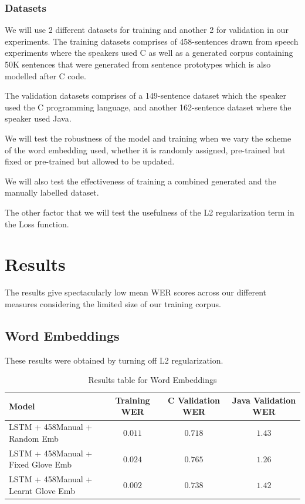 \documentclass[fyp]{socreport}
\begin{document}
\subsubsection{Datasets}
We will use 2 different datasets for training and another 2 for validation in
our experiments. The training datasets comprises of 458-sentences drawn from
speech experiments where the speakers used C as well as a generated corpus
containing 50K sentences that were generated from sentence prototypes which is
also modelled after C code.

The validation datasets comprises of a 149-sentence dataset which the speaker
used the C programming language, and another 162-sentence dataset where the speaker
used Java.

We will test the robustness of the model and training when we vary the scheme
of the word embedding used, whether it is randomly assigned, pre-trained but
fixed or pre-trained but allowed to be updated.

We will also test the effectiveness of training a combined generated and the
manually labelled dataset.

The other factor that we will test the usefulness of the L2 regularization term
in the Loss function.

\section{Results}
The results give spectacularly low mean WER scores across our different measures
considering the limited size of our training corpus.

\subsection{Word Embeddings}
These results were obtained by turning off L2 regularization.

\begin{table}[h!]
\centering
\begin{tabular}{ |p{3cm}||c|c|c| }
    \hline
   Model & Training WER & C Validation WER & Java Validation WER \\
    \hline
    LSTM + 458Manual + Random Emb       & $0.011$ & $0.718$ & $1.43$ \\
    \hline
    LSTM + 458Manual + Fixed Glove Emb  & $0.024$ & $0.765$ & $1.26$ \\
    \hline
    LSTM + 458Manual + Learnt Glove Emb & $0.002$ & $0.738$ & $1.42$ \\
    \hline
  \end{tabular}
  \caption{Results table for Word Embeddings}
  \label{table:1}
\end{table}
\end{document}
